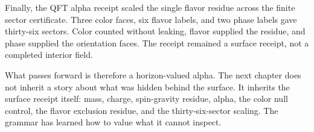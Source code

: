 Finally, the QFT alpha receipt scaled the single flavor residue across the
finite sector certificate. Three color faces, six flavor labels, and two
phase labels gave thirty-six sectors. Color counted without leaking, flavor
supplied the residue, and phase supplied the orientation faces. The receipt
remained a surface receipt, not a completed interior field.

What passes forward is therefore a horizon-valued alpha. The next chapter
does not inherit a story about what was hidden behind the surface. It
inherits the surface receipt itself: mass, charge, spin-gravity residue,
alpha, the color null control, the flavor exclusion residue, and the
thirty-six-sector scaling. The grammar has learned how to value what it
cannot inspect.
